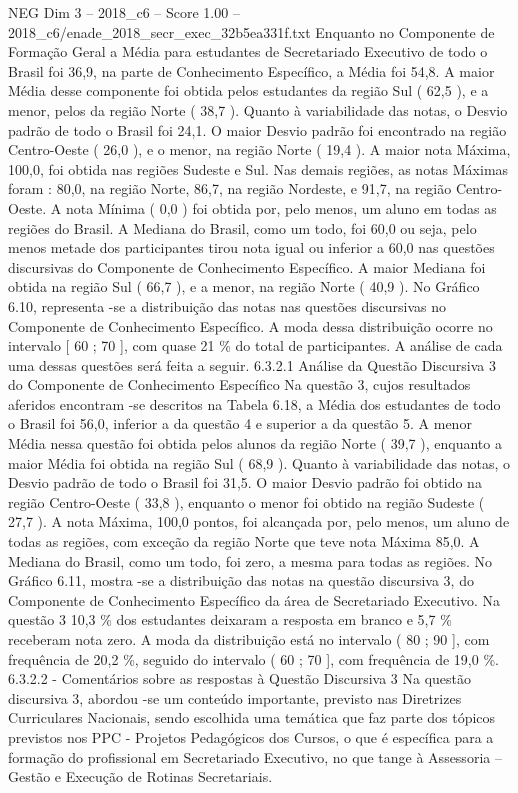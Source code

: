 \begin{textsample}{NEG Dim 3 – 2018\_c6 – Score 1.00 – 2018\_c6/enade\_2018\_secr\_exec\_32b5ea331f.txt}
Enquanto no Componente de Formação Geral a Média para estudantes de Secretariado Executivo de todo o Brasil foi 36,9, na parte de Conhecimento Específico, a Média foi 54,8.
A maior Média desse componente foi obtida pelos estudantes da região Sul ( 62,5 ), e a menor, pelos da região Norte ( 38,7 ).
Quanto à variabilidade das notas, o Desvio padrão de todo o Brasil foi 24,1.
O maior Desvio padrão foi encontrado na região Centro-Oeste ( 26,0 ), e o menor, na região Norte ( 19,4 ).
A maior nota Máxima, 100,0, foi obtida nas regiões Sudeste e Sul.
Nas demais regiões, as notas Máximas foram : 80,0, na região Norte, 86,7, na região Nordeste, e 91,7, na região Centro-Oeste.
A nota Mínima ( 0,0 ) foi obtida por, pelo menos, um aluno em todas as regiões do Brasil.
A Mediana do Brasil, como um todo, foi 60,0 ou seja, pelo menos metade dos participantes tirou nota igual ou inferior a 60,0 nas questões discursivas do Componente de Conhecimento Específico.
A maior Mediana foi obtida na região Sul ( 66,7 ), e a menor, na região Norte ( 40,9 ).
No Gráfico 6.10, representa -se a distribuição das notas nas questões discursivas no Componente de Conhecimento Específico.
A moda dessa distribuição ocorre no intervalo [ 60 ; 70 ], com quase 21 \% do total de participantes.
A análise de cada uma dessas questões será feita a seguir. 6.3.2.1 Análise da Questão Discursiva 3 do Componente de Conhecimento Específico Na questão 3, cujos resultados aferidos encontram -se descritos na Tabela 6.18, a Média dos estudantes de todo o Brasil foi 56,0, inferior a da questão 4 e superior a da questão 5.
A menor Média nessa questão foi obtida pelos alunos da região Norte ( 39,7 ), enquanto a maior Média foi obtida na região Sul ( 68,9 ).
Quanto à variabilidade das notas, o Desvio padrão de todo o Brasil foi 31,5.
O maior Desvio padrão foi obtido na região Centro-Oeste ( 33,8 ), enquanto o menor foi obtido na região Sudeste ( 27,7 ).
A nota Máxima, 100,0 pontos, foi alcançada por, pelo menos, um aluno de todas as regiões, com exceção da região Norte que teve nota Máxima 85,0.
A Mediana do Brasil, como um todo, foi zero, a mesma para todas as regiões.
No Gráfico 6.11, mostra -se a distribuição das notas na questão discursiva 3, do Componente de Conhecimento Específico da área de Secretariado Executivo.
Na questão 3 10,3 \% dos estudantes deixaram a resposta em branco e 5,7 \% receberam nota zero.
A moda da distribuição está no intervalo ( 80 ; 90 ], com frequência de 20,2 \%, seguido do intervalo ( 60 ; 70 ], com frequência de 19,0 \%. 6.3.2.2 - Comentários sobre as respostas à Questão Discursiva 3 Na questão discursiva 3, abordou -se um conteúdo importante, previsto nas Diretrizes Curriculares Nacionais, sendo escolhida uma temática que faz parte dos tópicos previstos nos PPC - Projetos Pedagógicos dos Cursos, o que é específica para a formação do profissional em Secretariado Executivo, no que tange à Assessoria – Gestão e Execução de Rotinas Secretariais.

\end{textsample}
